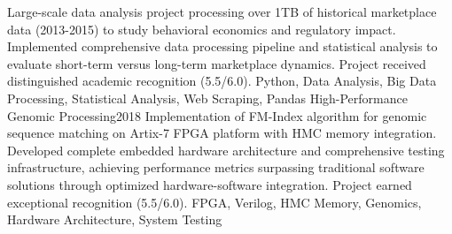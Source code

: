 \begin{projects}
{{Large-scale data analysis project processing over 1TB of historical marketplace data (2013-2015) to study behavioral economics and regulatory impact. Implemented comprehensive data processing pipeline and statistical analysis to evaluate short-term versus long-term marketplace dynamics. Project received distinguished academic recognition (5.5/6.0).}
{Python, Data Analysis, Big Data Processing, Statistical Analysis, Web Scraping, Pandas}
\newpage
\project
{High-Performance Genomic Processing}{2018}
{}
{Implementation of FM-Index algorithm for genomic sequence matching on Artix-7 FPGA platform with HMC memory integration. Developed complete embedded hardware architecture and comprehensive testing infrastructure, achieving performance metrics surpassing traditional software solutions through optimized hardware-software integration. Project earned exceptional recognition (5.5/6.0).}
{FPGA, Verilog, HMC Memory, Genomics, Hardware Architecture, System Testing}
}
\end{projects}